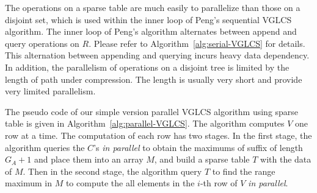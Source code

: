 The operations on a sparse table are much easily to parallelize than
those on a disjoint set, which is used within the inner loop of Peng's
sequential VGLCS algorithm.  The inner loop of Peng's algorithm
alternates between append and query operations on $R$.  Please refer
to Algorithm~\ref{alg:serial-VGLCS} for details.  This alternation
between appending and querying incurs heavy data dependency.  In
addition, the parallelism of operations on a disjoint tree is limited
by the length of path under compression.  The length is usually very
short and provide very limited parallelism.

The pseudo code of our simple version parallel VGLCS algorithm using
sparse table is given in Algorithm~\ref{alg:parallel-VGLCS}.  The
algorithm computes $V$ one row at a time.  The computation of each row
has two stages.  In the first stage, the algorithm queries the $C$'s
{\em in parallel} to obtain the maximums of suffix of length $G_A + 1$
and place them into an array $M$, and build a sparse table $T$ with
the data of $M$.  Then in the second stage, the algorithm query $T$ to
find the range maximum in $M$ to compute the all elements in the
$i$-th row of $V$ {\em in parallel}.





